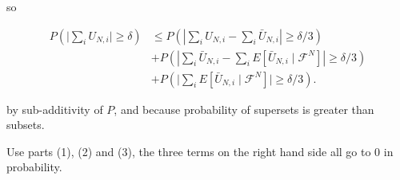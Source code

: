 \documentclass{article}
\begin{document}
so

\begin{align*}
P\left( \bigg\rvert \sum_i U_{N,i} \bigg\rvert  \ge \delta \right)  &\le P\left( \left| \sum_i U_{N,i} - \sum_i \bar{U}_{N,i}\right| \ge \delta/3 \right) \\
& + P \left( \left|\sum_i \bar{U}_{N,i} - \sum_i E[ \bar{U}_{N,i}  \mid \mathcal{F}^N] \right| \ge \delta/3 \right) \\
&+ P \left( \bigg\rvert \sum_i E[ \bar{U}_{N,i}  \mid \mathcal{F}^N]\bigg\rvert \ge \delta/3 \right ).
\end{align*}

by sub-additivity of $P$, and because probability of supersets is greater than subsets.

Use parts (1), (2) and (3), the three terms on the right hand side all go to $0$ in probability. 
\end{document}
